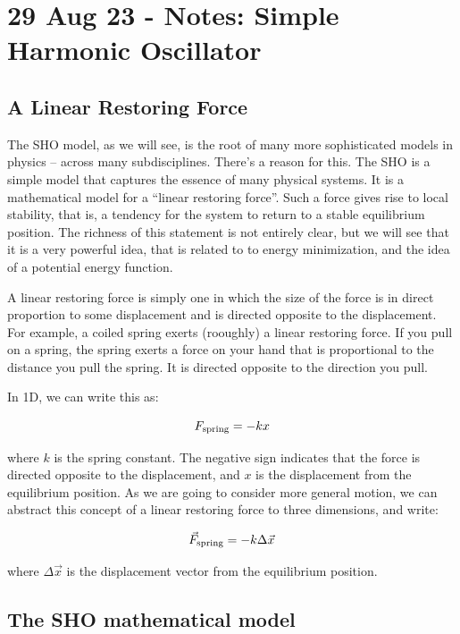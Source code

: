 \section{29 Aug 23 - Notes: Simple Harmonic
Oscillator}\label{aug-23---notes-simple-harmonic-oscillator}

\subsection{A Linear Restoring Force}\label{a-linear-restoring-force}

The SHO model, as we will see, is the root of many more sophisticated
models in physics -- across many subdisciplines. There's a reason for
this. The SHO is a simple model that captures the essence of many
physical systems. It is a mathematical model for a ``linear restoring
force''. Such a force gives rise to local stability, that is, a tendency
for the system to return to a stable equilibrium position. The richness
of this statement is not entirely clear, but we will see that it is a
very powerful idea, that is related to to energy minimization, and the
idea of a potential energy function.

A linear restoring force is simply one in which the size of the force is
in direct proportion to some displacement and is directed opposite to
the displacement. For example, a coiled spring exerts (rooughly) a
linear restoring force. If you pull on a spring, the spring exerts a
force on your hand that is proportional to the distance you pull the
spring. It is directed opposite to the direction you pull.

In 1D, we can write this as:

\[F_{\rm spring} = -kx\]

where \(k\) is the spring constant. The negative sign indicates that the
force is directed opposite to the displacement, and \(x\) is the
displacement from the equilibrium position. As we are going to consider
more general motion, we can abstract this concept of a linear restoring
force to three dimensions, and write:

\[\vec{F}_{\rm spring} = -k \Delta \vec{x}\]

where \(\Delta \vec{x}\) is the displacement vector from the equilibrium
position.

\subsection{The SHO mathematical
model}\label{the-sho-mathematical-model}

